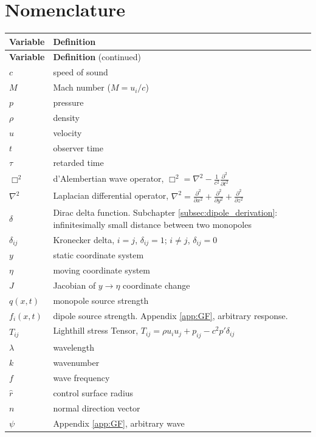 \chapter*{Nomenclature}

\begin{longtable}{p{2.5cm} p{13.5cm}}
\textbf{Variable} & \textbf{Definition} \\
\endfirsthead

\textbf{Variable} & \textbf{Definition} (continued) \\
\endhead

$c$ & speed of sound \\
$M$ & Mach number ($M = u_i/c$) \\
$p$ & pressure \\
$\rho$ & density \\
$u$ & velocity \\
$t$ & observer time \\
$\tau$ & retarded time \\
$\Box^2$ & d'Alembertian wave operator, $\Box^2 = \nabla^2 - \frac{1}{c^2}\frac{\partial^2}{\partial t^2}$ \\
$\nabla^2$ & Laplacian differential operator, $\nabla^2 = \frac{\partial^2}{\partial x^2} + \frac{\partial^2}{\partial y^2} + \frac{\partial^2}{\partial z^2}$ \\
$\delta$ & Dirac delta function. Subchapter \ref{subsec:dipole_derivation}: infinitesimally small distance between two monopoles \\
$\delta_{ij}$ & Kronecker delta, $i=j$, $\delta_{ij}=1$; $i \neq j$, $\delta_{ij}=0$ \\
$y$ & static coordinate system \\
$\eta$ & moving coordinate system \\
$J$ & Jacobian of $y \rightarrow \eta$ coordinate change \\
$q(x,t)$ & monopole source strength \\
$f_i(x,t)$ & dipole source strength. Appendix \ref{app:GF}, arbitrary response. \\
$T_{ij}$ & Lighthill stress Tensor, $T_{ij} = \rho u_i u_j + p_{ij} - c^2 p' \delta_{ij}$ \\
$\lambda$ & wavelength \\
$k$ & wavenumber \\
$f$ & wave frequency \\
$\hat{r}$ & control surface radius \\
$n$ & normal direction vector \\
$\psi$ & Appendix \ref{app:GF}, arbitrary wave \\


\end{longtable}
